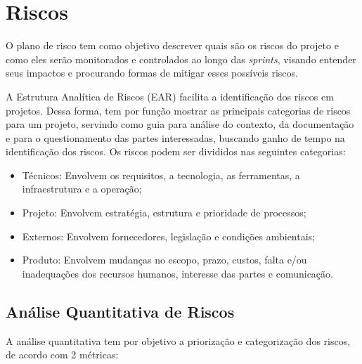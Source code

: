 \chapter[Riscos]{Riscos}

O plano de risco tem como objetivo descrever quais são os riscos do projeto e como eles serão monitorados e controlados ao longo das \textit{sprints}, visando entender seus impactos e procurando formas de mitigar esses possíveis riscos.

A Estrutura Analítica de Riscos (EAR) facilita a identificação dos riscos em projetos. Dessa forma, tem por função mostrar as principais categorias de riscos para um projeto, servindo como guia para análise do contexto, da documentação e para o questionamento das partes interessadas, buscando ganho de tempo na identificação dos riscos.
Os riscos podem ser divididos nas seguintes categorias:

\begin{itemize}
\item Técnicos: Envolvem os requisitos, a tecnologia, as ferramentas, a infraestrutura e a operação;
\item Projeto: Envolvem estratégia, estrutura e prioridade de processos;
\item Externos: Envolvem fornecedores, legislação e condições ambientais;
\item Produto: Envolvem mudanças no escopo, prazo, custos, falta e/ou inadequações dos recursos humanos, interesse das partes e comunicação.
\end{itemize}

\section{Análise Quantitativa de Riscos}

A análise quantitativa tem por objetivo a priorização e categorização dos riscos, de acordo com 2 métricas:

